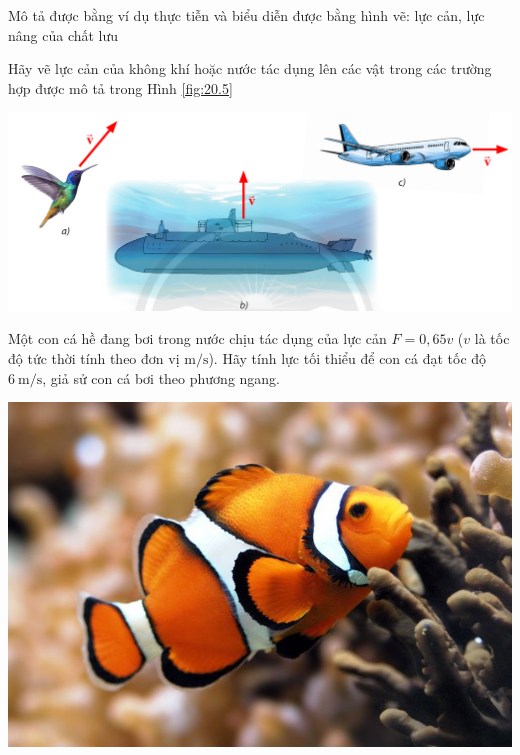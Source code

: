 \begin{dang}{ Mô tả được bằng ví dụ thực tiễn và biểu diễn được bằng hình vẽ: lực cản, lực nâng của chất lưu}
	{Hãy vẽ lực cản của không khí hoặc nước tác dụng lên các vật trong các trường hợp được mô tả trong Hình \ref{fig:20.5}
		\begin{center}
			\includegraphics[width=0.6\linewidth]{../figs/VN10-2023-PH-TP020-5}
			\label{fig:20.5}
		\end{center}
}
{}


{Một con cá hề đang bơi trong nước chịu tác dụng của lực cản $F=0,65v$ ($v$ là tốc độ tức thời tính theo đơn vị $\si{\meter/\second}$). Hãy tính lực tối thiểu để con cá đạt tốc độ $\SI{6}{\meter/\second}$, giả sử con cá bơi theo phương ngang.
	\begin{center}
		\includegraphics[width=0.2\linewidth]{../figs/VN10-2023-PH-TP020-7}
	\end{center}
}
{}
\end{dang}

